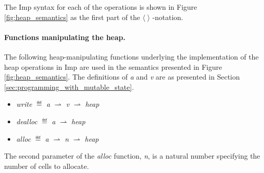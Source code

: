 The Imp syntax for each of the operations is shown in Figure \ref{fig:heap_semantics} as the first part of the $\langle \; \rangle$  -notation. 
\paragraph{Functions manipulating the heap.}
The following heap-manipulating functions underlying the implementation of the heap operations in Imp are used in the semantics presented in Figure \ref{fig:heap_semantics}. The definitions of {\it a} and {\it v} are as presented in Section \ref{sec:programming_with_mutable_state}.
\begin{itemize}
\item {\it write} $\eqdef$ {\it a} $\rightharpoonup$ {\it v} $\rightharpoonup$ {\it heap}
\item {\it dealloc} $\eqdef$ {\it a} $\rightharpoonup$ {\it heap}
\item {\it alloc} $\eqdef$ {\it a} $\rightharpoonup$ {\it n} $\rightharpoonup$ {\it heap}
\end{itemize}
The second parameter of the {\it alloc} function, {\it n}, is a natural number specifying the number of cells to allocate.

